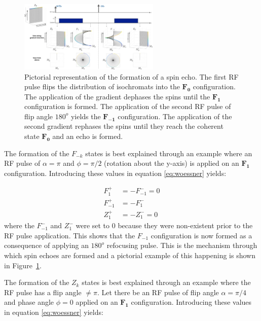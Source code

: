 \hfill

\begin{figure}[H]
    \centering
    \includegraphics[angle=90,width=0.6\textwidth, keepaspectratio]{images/mrf/spinechoinepg}
    \caption{Pictorial representation of the formation of a spin echo.
    The first RF pulse flips the distribution of isochromats into the $\bm{F_0}$ configuration.
    The application of the gradient dephases the spins until the $\bm{F_1}$ configuration is formed.
    The application of the second RF pulse of flip angle $180^o$ yields the $\bm{F_{-1}}$ configuration.
    The application of the second gradient rephases the spins until they reach the coherent state $\bm{F_0}$ and an echo is formed.}
    \label{fig:spinechoinepg}
\end{figure}

The formation of the $F_{-k}$ states is best explained through an example where an RF pulse of $\alpha = \pi$ and $\phi = \pi/2$ (rotation about the y-axis) is applied on an $\bm{F_1}$ configuration.
Introducing these values in equation \ref{eq:woessner} yields:

\begin{equation}
\begin{split}
    F_{1}^+  &= - F_{-1}^- = 0 \\
    F_{-1}^+ &= - F_{1}^-  \\
    Z_{1}^+  &= - Z_{1}^- = 0
\end{split}
\end{equation}
where the $F_{-1}^-$ and $Z_{1}^-$ were set to $0$ because they were non-existent prior to the RF pulse application.
This shows that the $F_{-1}$ configuration is now formed as a consequence of applying an $180^o$ refocusing pulse.
This is the mechanism through which spin echoes are formed and a pictorial example of this happening is shown in Figure~\ref{fig:spinechoinepg}.

\hfill

The formation of the $Z_{k}$ states is best explained through an example where the RF pulse has a flip angle $\neq \pi$.
Let there be an RF pulse of flip angle $\alpha = \pi/4$ and phase angle $\phi = 0$ applied on an $\bm{F_1}$ configuration.
Introducing these values in equation \ref{eq:woessner} yields:

